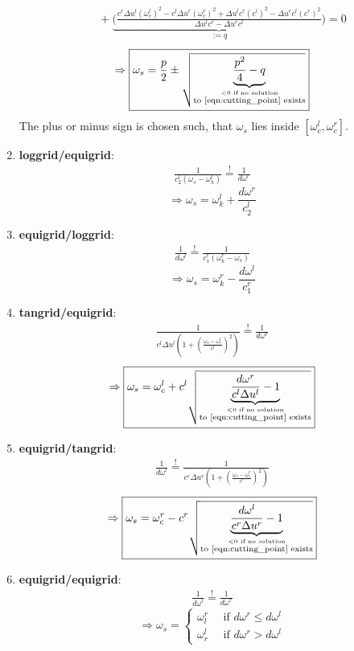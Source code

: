 \begin{enumerate}
\begin{align*}
			\\
			&\quad  + \underbrace{\biggl(\frac{c^r \Delta u^l (\omega_c^l)^2 - c^l \Delta u^r (\omega_c^r)^2 + \Delta u^l c^r (c^l)^2 - \Delta u^r c^l (c^r)^2}{\Delta u^l c^r - \Delta u^r c^l}\biggr)}_{:=q}=0
		\end{align*}
		\[
			\Rightarrow \boxed{\omega_s= \frac{p}{2} \pm \sqrt{\underbrace{\frac{p^2}{4}-q}_{\stackrel{<0 \text{ if no solution}}{\text{to \ref{eqn:cutting_point} exists} } } }}
		\]
		The plus or minus sign is chosen such, that $\omega_s$ lies inside $[\omega_c^l, \omega_c^r]$.

	\item {\bf loggrid/equigrid}:
		\begin{align*}
			\frac{1}{c_2^l(\omega_s-\omega_k^l)}\stackrel{!}{=}\frac{1}{d\omega^r}
		\end{align*}
		\[
			\Rightarrow \boxed{\omega_s= \omega_k^l + \frac{d\omega^r}{c_2^l}}
		\]
	\item {\bf equigrid/loggrid}:
		\begin{align*}
			\frac{1}{d\omega^l}\stackrel{!}{=}\frac{1}{c_1^r(\omega_k^r-\omega_s)}
		\end{align*}
		\[
			\Rightarrow \boxed{\omega_s= \omega_k^r - \frac{d\omega^l}{c_1^r}}
		\]
	\item {\bf tangrid/equigrid}:
		\begin{align*}
			\frac{1}{c^l\Delta u^l\left(1+\left(\frac{\omega_s-\omega_c^l}{c^l}\right)^2\right)}\stackrel{!}{=}\frac{1}{d\omega^r}
		\end{align*}
		\[
			\Rightarrow \boxed{\omega_s= \omega_c^l + c^l \sqrt{\underbrace{\frac{d\omega^r}{c^l\Delta u^l} -1}_{\stackrel{<0 \text{ if no solution}}{\text{to \ref{eqn:cutting_point} exists} } }}}
		\]
	\item {\bf equigrid/tangrid}:
		\begin{align*}
			\frac{1}{d\omega^l}\stackrel{!}{=}\frac{1}{c^r\Delta u^r\left(1+\left(\frac{\omega_s-\omega_c^r}{c^r}\right)^2\right)}
		\end{align*}
		\[
			\Rightarrow \boxed{\omega_s= \omega_c^r - c^r \sqrt{\underbrace{\frac{d\omega^l}{c^r\Delta u^r} -1}_{\stackrel{<0 \text{ if no solution}}{\text{to \ref{eqn:cutting_point} exists} } }}}
		\]
	\item {\bf equigrid/equigrid}:
		\begin{align*}
			\frac{1}{d\omega^l}\stackrel{!}{=}\frac{1}{d\omega^r}
		\end{align*}
		\[
			\Rightarrow 
			\boxed{\omega_s= \begin{cases}
							\omega_l^r \quad \text{ if } d\omega^r \leq d\omega^l \\
							\omega_r^l \quad \text{ if } d\omega^r > d\omega^l
			                             \end{cases}
			}
		\]
\end{enumerate}


